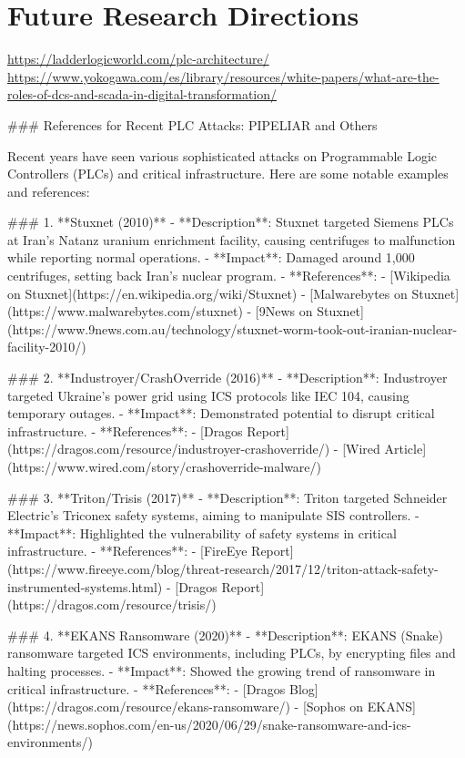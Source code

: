 \section{Future Research Directions}
\label{sec:data_gen}

\url{https://ladderlogicworld.com/plc-architecture/}
\url{https://www.yokogawa.com/es/library/resources/white-papers/what-are-the-roles-of-dcs-and-scada-in-digital-transformation/}


### References for Recent PLC Attacks: PIPELIAR and Others

Recent years have seen various sophisticated attacks on Programmable Logic Controllers (PLCs) and critical infrastructure. Here are some notable examples and references:

### 1. **Stuxnet (2010)**
- **Description**: Stuxnet targeted Siemens PLCs at Iran’s Natanz uranium enrichment facility, causing centrifuges to malfunction while reporting normal operations.
- **Impact**: Damaged around 1,000 centrifuges, setting back Iran’s nuclear program.
- **References**:
  - [Wikipedia on Stuxnet](https://en.wikipedia.org/wiki/Stuxnet)
  - [Malwarebytes on Stuxnet](https://www.malwarebytes.com/stuxnet)
  - [9News on Stuxnet](https://www.9news.com.au/technology/stuxnet-worm-took-out-iranian-nuclear-facility-2010/)

### 2. **Industroyer/CrashOverride (2016)**
- **Description**: Industroyer targeted Ukraine’s power grid using ICS protocols like IEC 104, causing temporary outages.
- **Impact**: Demonstrated potential to disrupt critical infrastructure.
- **References**:
  - [Dragos Report](https://dragos.com/resource/industroyer-crashoverride/)
  - [Wired Article](https://www.wired.com/story/crashoverride-malware/)

### 3. **Triton/Trisis (2017)**
- **Description**: Triton targeted Schneider Electric’s Triconex safety systems, aiming to manipulate SIS controllers.
- **Impact**: Highlighted the vulnerability of safety systems in critical infrastructure.
- **References**:
  - [FireEye Report](https://www.fireeye.com/blog/threat-research/2017/12/triton-attack-safety-instrumented-systems.html)
  - [Dragos Report](https://dragos.com/resource/trisis/)

### 4. **EKANS Ransomware (2020)**
- **Description**: EKANS (Snake) ransomware targeted ICS environments, including PLCs, by encrypting files and halting processes.
- **Impact**: Showed the growing trend of ransomware in critical infrastructure.
- **References**:
  - [Dragos Blog](https://dragos.com/resource/ekans-ransomware/)
  - [Sophos on EKANS](https://news.sophos.com/en-us/2020/06/29/snake-ransomware-and-ics-environments/)


